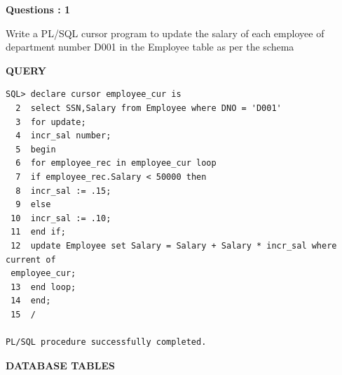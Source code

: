 \documentclass[a4paper,12pt]{report}
\begin{document}
\begin{flushleft}
    \textbf{Questions : 1}
\end{flushleft}
Write a PL/SQL cursor program to update the salary of each employee of department number D001 in the Employee table as per the schema
	\begin{flushleft}
		\textbf{QUERY }
	\end{flushleft}
 \begin{verbatim}
SQL> declare cursor employee_cur is
  2  select SSN,Salary from Employee where DNO = 'D001'
  3  for update;
  4  incr_sal number;
  5  begin
  6  for employee_rec in employee_cur loop
  7  if employee_rec.Salary < 50000 then
  8  incr_sal := .15;
  9  else
 10  incr_sal := .10;
 11  end if;
 12  update Employee set Salary = Salary + Salary * incr_sal where current of
 employee_cur;
 13  end loop;
 14  end;
 15  /

PL/SQL procedure successfully completed.
\end{verbatim}
\begin{flushleft}
		\textbf{DATABASE TABLES} 
\end{flushleft} 
\end{document}
